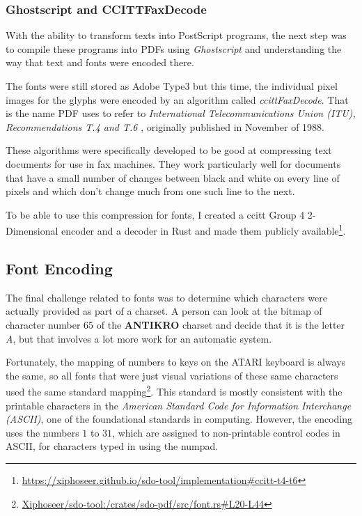 \subsubsection{Ghostscript and CCITTFaxDecode}

With the ability to transform \Signum{} texts into PostScript programs, the next step was to compile these programs into PDFs using \textit{Ghostscript} and understanding the way that text and fonts were encoded there.

The fonts were still stored as Adobe Type3 but this time, the individual pixel images for the glyphs were encoded by an algorithm called \textit{\acrshort{ccitt}FaxDecode}. That is the name PDF uses to refer to \textit{International Telecommunications Union (ITU), Recommendations T.4 and T.6} \cites{murray1996ccitt, ccitt1988t4, ccitt1988t6}, originally published in November of 1988.

These algorithms were specifically developed to be good at compressing text documents for use in fax machines. They work particularly well for documents that have a small number of changes between black and white on every line of pixels and which don't change much from one such line to the next.

To be able to use this compression for \Signum{} fonts, I created a \acrshort{ccitt} Group 4 2-Dimensional encoder and a decoder in Rust and made them publicly available\footnote{\url{https://xiphoseer.github.io/sdo-tool/implementation\#ccitt-t4-t6}}.

\label{sec:encoding}
\subsection{Font Encoding}

The final challenge related to \Signum{} fonts was to determine which characters were actually provided as part of a charset. A person can look at the bitmap of character number 65 of the \textbf{ANTIKRO} charset and decide that it is the letter \textit{A}, but that involves a lot more work for an automatic system.

Fortunately, the mapping of numbers to keys on the ATARI keyboard is always the same, so all fonts that were just visual variations of these same characters used the same standard mapping\footnote{\href{https://github.com/Xiphoseer/sdo-tool/blob/196fbf9e79c127cb6bfda1a5bb91e51581d050b1/crates/sdo-pdf/src/font.rs\#L20-L44}{Xiphoseer/sdo-tool:/crates/sdo-pdf/src/font.rs\#L20-L44}}. This standard is mostly consistent with the printable characters in the \textit{American Standard Code for Information Interchange (ASCII)}, one of the foundational standards in computing. However, the \Signum{} encoding uses the numbers $1$ to $31$, which are assigned to non-printable control codes in ASCII, for characters typed in using the numpad.

